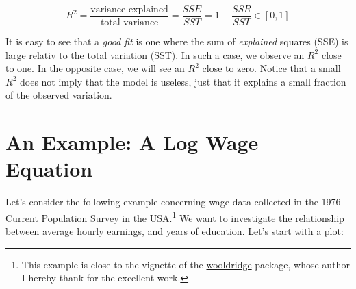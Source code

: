\documentclass[]{book}
\begin{document}
\begin{equation}
R^2 = \frac{\text{variance explained}}{\text{total variance}} = \frac{SSE}{SST} = 1 - \frac{SSR}{SST}\in[0,1]  \label{eq:Rsquared}
\end{equation}

It is easy to see that a \emph{good fit} is one where the sum of \emph{explained} squares (SSE) is large relativ to the total variation (SST). In such a case, we observe an \(R^2\) close to one. In the opposite case, we will see an \(R^2\) close to zero. Notice that a small \(R^2\) does not imply that the model is useless, just that it explains a small fraction of the observed variation.

\hypertarget{an-example-a-log-wage-equation}{%
\section{An Example: A Log Wage Equation}\label{an-example-a-log-wage-equation}}

Let's consider the following example concerning wage data collected in the 1976 Current Population Survey in the USA.\footnote{This example is close to the vignette of the \href{https://cloud.r-project.org/web/packages/wooldridge/index.html}{wooldridge} package, whose author I hereby thank for the excellent work.} We want to investigate the relationship between average hourly earnings, and years of education. Let's start with a plot:
\end{document}
